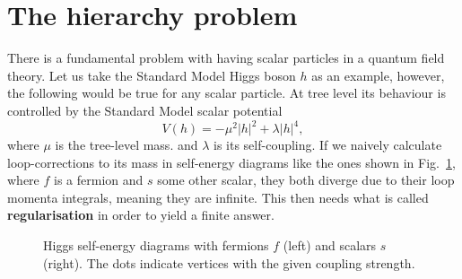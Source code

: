 \documentclass[notes.tex]{subfiles}
\begin{document}
\section{The hierarchy problem}
There is a fundamental problem with having scalar particles in a quantum field theory. Let us take the Standard Model Higgs boson $h$ as an example, however, the following would be true for any scalar particle. At tree level its behaviour is controlled by the Standard Model scalar potential
\begin{equation}
V(h)=-\mu^2|h|^2+\lambda |h|^4,
\label{eq:SM_Higgs_potential}
\end{equation}
where $\mu$ is the tree-level mass. and $\lambda$ is its self-coupling. If we naively calculate loop-corrections to its mass in self-energy diagrams like the ones shown in Fig.~\ref{fig:hierarchy}, where $f$ is a fermion and $s$ some other scalar, they both diverge due to their loop momenta integrals, meaning they are infinite. This then needs what is called {\bf regularisation} in order to yield a finite answer. 

\begin{figure}
\centering
{}
\caption{Higgs self-energy diagrams with fermions $f$ (left) and scalars $s$ (right). The dots indicate vertices with the given coupling strength.}  
\label{fig:hierarchy}
\end{figure}
\end{document}
